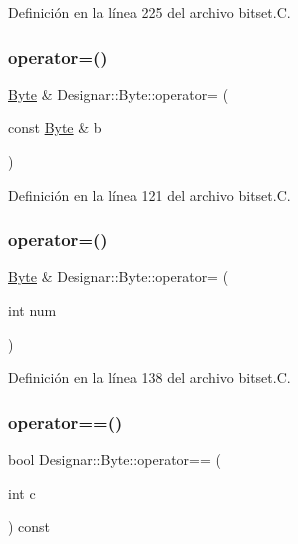 Definición en la línea 225 del archivo bitset.\+C.

\mbox{\label{class_designar_1_1_byte_ab139736eebd931cb54f89fa2b01964fb}} 
\subsubsection{\texorpdfstring{operator=()}{operator=()}\hspace{0.1cm}{\footnotesize\ttfamily [1/2]}}
{\footnotesize\ttfamily \hyperlink{class_designar_1_1_byte}{Byte} \& Designar\+::\+Byte\+::operator= (\begin{DoxyParamCaption}\item[{const \hyperlink{class_designar_1_1_byte}{Byte} \&}]{b }\end{DoxyParamCaption})}



Definición en la línea 121 del archivo bitset.\+C.

\mbox{\label{class_designar_1_1_byte_a1bc5154efe3f2ca906bbdd8c1d9b56ff}} 
\subsubsection{\texorpdfstring{operator=()}{operator=()}\hspace{0.1cm}{\footnotesize\ttfamily [2/2]}}
{\footnotesize\ttfamily \hyperlink{class_designar_1_1_byte}{Byte} \& Designar\+::\+Byte\+::operator= (\begin{DoxyParamCaption}\item[{int}]{num }\end{DoxyParamCaption})}



Definición en la línea 138 del archivo bitset.\+C.

\mbox{\label{class_designar_1_1_byte_aefd8f12d0f09d688f2977d86e387eabd}} 
\subsubsection{\texorpdfstring{operator==()}{operator==()}}
{\footnotesize\ttfamily bool Designar\+::\+Byte\+::operator== (\begin{DoxyParamCaption}\item[{int}]{c }\end{DoxyParamCaption}) const}



